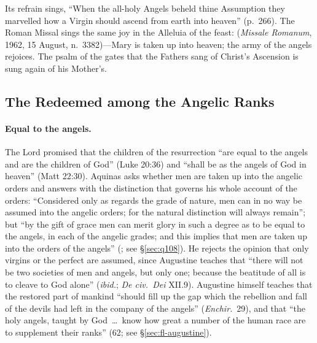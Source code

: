 \noindent Its refrain sings, ``When the all-holy Angels beheld thine
Assumption they marvelled how a Virgin should ascend from earth into
heaven'' (p.~266). The Roman Missal sings the same joy in the Alleluia of
the feast: 
(\emph{Missale Romanum}, 1962, 15 August, n.~3382)---Mary is taken up into
heaven; the army of the angels rejoices. The psalm of the gates that the
Fathers sang of Christ's Ascension is sung again of his Mother's.

\sectionguard
\subsection{The Redeemed among the Angelic Ranks}\label{sec:cm-ranks}

\paragraph{Equal to the angels.} The Lord promised that the children of the
resurrection ``are equal to the angels and are the children of God'' (Luke
20:36) and ``shall be as the angels of God in heaven'' (Matt 22:30). Aquinas
asks whether men are taken up into the angelic orders and answers with the
distinction that governs his whole account of the orders: ``Considered only
as regards the grade of nature, men can in no way be assumed into the
angelic orders; for the natural distinction will always remain''; but ``by
the gift of grace men can merit glory in such a degree as to be equal to the
angels, in each of the angelic grades; and this implies that men are taken
up into the orders of the angels'' (; see \S\ref{sec:q108}).
He rejects the opinion that only virgins or the perfect are assumed, since
Augustine teaches that ``there will not be two societies of men and angels,
but only one; because the beatitude of all is to cleave to God alone''
(\emph{ibid.}; \emph{De civ.\ Dei} XII.9). Augustine himself teaches that
the restored part of mankind ``should fill up the gap which the rebellion
and fall of the devils had left in the company of the angels''
(\emph{Enchir.}\ 29), and that ``the holy angels, taught by God~\dots\ know
how great a number of the human race are to supplement their ranks'' (62;
see \S\ref{sec:fl-augustine}).

